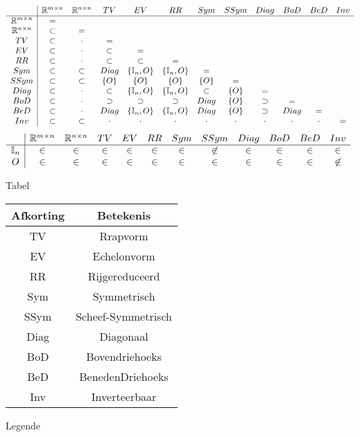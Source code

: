 \documentclass[lineaire_algebra_oplossingen.tex]{subfiles}
\begin{document}
\begin{figure}
\centering
\[
\begin{array}{c | c c c c c c c c c c c}
 & \mathbb{R}^{m\times n} & \mathbb{R}^{n\times n} & TV & EV & RR & Sym & SSym & Diag & BoD & BeD & Inv\\
 \hline
\mathbb{R}^{m\times n} 	& =\\
\mathbb{R}^{n\times n} 	& \subset 	& =\\
TV 						& \subset 	& \cdot 	& =\\
EV 						& \subset 	& \cdot 	& \subset 	& =\\
RR 						& \subset 	& \cdot 	& \subset 	& \subset 			& =\\ 
Sym 					& \subset	& \subset	& Diag		& \{\mathbb{I}_n,O\}& \{\mathbb{I}_n,O\}& =\\
SSym 					& \subset	& \subset	& \{O\}		& \{O\}				& \{O\} 			& \{O\}	& =\\
Diag 					& \subset	& \cdot		& \subset	& \{\mathbb{I}_n,O\}& \{\mathbb{I}_n,O\}& \subset	& \{O\}	& =\\
BoD 					& \subset	& \cdot		& \supset	& \supset 			& \supset			& Diag				& \{O\}	& \supset	& =\\
BeD 					& \subset	& \cdot		& Diag		& \{\mathbb{I}_n,O\}& \{\mathbb{I}_n,O\}& Diag				& \{O\} & \supset	& Diag	& =\\
Inv						& \subset	& \subset	& \cdot		& \cdot 			& \cdot 			& \cdot	& \cdot 		& \cdot	& \cdot		& \cdot 	& =\\
\end{array}
\]
\[
\begin{array}{c | c c c c c c c c c c c}
 & \mathbb{R}^{m\times n} & \mathbb{R}^{n\times n} & TV & EV & RR & Sym & SSym & Diag & BoD & BeD & Inv\\
\hline
\mathbb{I}_n 			& \in & \in & \in & \in & \in & \in & \not\in 	& \in & \in & \in & \in \\
O 						& \in & \in & \in & \in & \in & \in & \in 		& \in & \in & \in & \not\in\\
\end{array}
\]
\label{tabel}
\caption{Tabel}
\end{figure}


\begin{figure}[H]
\centering
\begin{tabular}{| c | c |}
\hline
Afkorting & Betekenis\\
\hline
TV & Rrapvorm\\
EV & Echelonvorm\\
RR & Rijgereduceerd\\
Sym & Symmetrisch\\
SSym & Scheef-Symmetrisch\\
Diag & Diagonaal\\
BoD & Bovendriehoeks\\
BeD & BenedenDriehoeks\\
Inv & Inverteerbaar\\
\hline
\end{tabular}
\label{legende}
\caption{Legende}
\end{figure}
\end{document}
